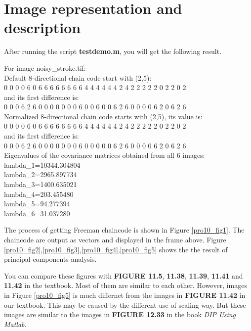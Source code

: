\documentclass[11pt,a4paper]{article}
\begin{document}
\section{Image representation and description}
After running the script \textbf{testdemo.m}, you will get the following result.

\begin{shaded}
	\noindent For image noisy\_stroke.tif:\\
	Default 8-directional chain code start with (2,5):\\
	0 0 0 0 6 0 6 6 6 6 6 6 6 6 4 4 4 4 4 4 2 4 2 2 2 2 2 0 2 2 0 2\\
	and its first difference is:\\
	0 0 0 6 2 6 0 0 0 0 0 0 0 6 0 0 0 0 0 6 2 6 0 0 0 0 6 2 0 6 2 6\\
	 Normalized 8-directional chain code starts with (2,5), its value is:\\
	0 0 0 0 6 0 6 6 6 6 6 6 6 6 4 4 4 4 4 4 2 4 2 2 2 2 2 0 2 2 0 2\\
	and its first difference is:\\
	0 0 0 6 2 6 0 0 0 0 0 0 0 6 0 0 0 0 0 6 2 6 0 0 0 0 6 2 0 6 2 6\\
	Eigenvalues of the covariance matrices obtained from all 6 images:\\
	lambda\_1=10344.304804\\
	lambda\_2=2965.897734\\
	lambda\_3=1400.635021\\
	lambda\_4=203.455480\\
	lambda\_5=94.277394\\
	lambda\_6=31.037280
\end{shaded}

The process of getting Freeman chaincode is shown in Figure \ref{pro10_fig1}.
The chaincode are output as vectors and displayed in the frame above.
Figure \ref{pro10_fig2},\ref{pro10_fig3},\ref{pro10_fig4},\ref{pro10_fig5} shows the
the result of principal components analysis.

You can compare these figures with \textbf{FIGURE 11.5}, \textbf{11.38}, \textbf{11.39}, \textbf{11.41}
and \textbf{11.42} in the
textbook. Most of them are similar to each other. However, images in 
Figure \ref{pro10_fig5} is much differnet from the images in \textbf{FIGURE 11.42} in our textbook.
This may be caused by the different use of scaling way. But these images are similar to the images in 
\textbf{FIGURE 12.33} in the book \emph{DIP Using Matlab}.
\end{document}
